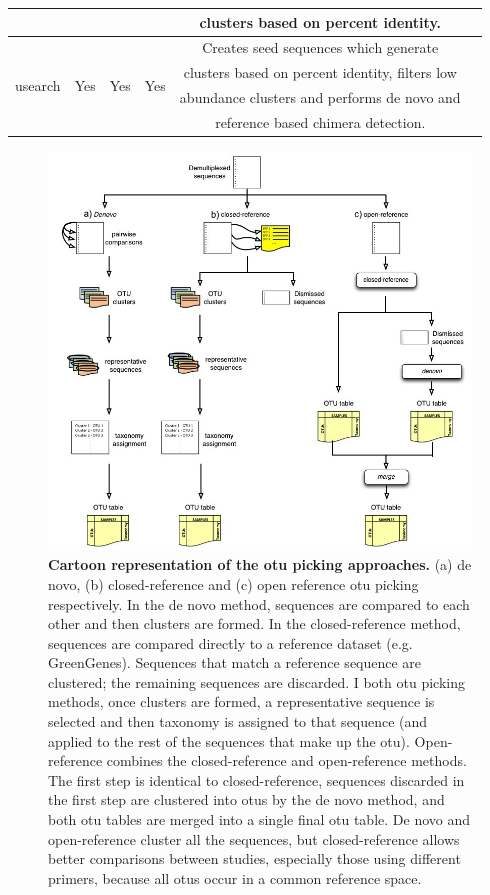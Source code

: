 \begin{table}
\begin{tabular*}{\textwidth}{cccccc}
& & & & clusters based on percent identity. & \\
\midrule
\multirow{4}{*}{usearch} & \multirow{4}{*}{Yes} & \multirow{4}{*}{Yes} & \multirow{4}{*}{Yes} & Creates seed sequences which generate & \multirow{4}{*}{\cite{Edgar2010}}\\
& & & & clusters based on percent identity, filters low & \\
& & & & abundance clusters and performs de novo and & \\
& & & & reference based chimera detection. & \\
\bottomrule
\end{tabular*}
\end{table}
\renewcommand{\arraystretch}{1}%

\begin{figure}[htbp]
\includegraphics[width=0.75\columnwidth]{chapter_book_figures/Figure_2.jpg}
\caption[Cartoon representation of the \gls{otu} picking approaches]{\textbf{Cartoon representation of the \gls{otu} picking approaches.}
(a) de novo, (b) closed-reference and (c) open reference \gls{otu} picking respectively.
In the de novo method, sequences are compared to each other and then clusters are formed.
In the closed-reference method, sequences are compared directly to a reference dataset (e.g. GreenGenes).
Sequences that match a reference sequence are clustered; the remaining sequences are discarded. I
both \gls{otu} picking methods, once clusters are formed, a representative sequence is selected and
then taxonomy is assigned to that sequence (and applied to the rest of the sequences that make up the \gls{otu}).
Open-reference combines the closed-reference and open-reference methods. The first step is identical to
closed-reference, sequences discarded in the first step are clustered into \gls{otu}s by the de novo method,
and both \gls{otu} tables are merged into a single final \gls{otu} table. De novo and open-reference cluster all
the sequences, but closed-reference allows better comparisons between studies, especially those using
different primers, because all \gls{otu}s occur in a common reference space.}
\label{bfigure2}
\end{figure}

